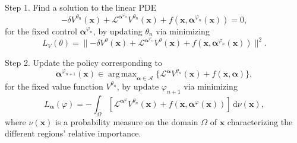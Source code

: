 \documentclass[12pt]{article}
\newcommand{\mc}[1]{\mathcal{#1}}
\newcommand{\ud}{\,\mathrm{d}}
\DeclareMathOperator*{\argmax}{arg\,max}
\begin{document}
\vspace{0.25cm}

\noindent Step 1. Find a solution to the linear PDE
\begin{equation*}
   - \delta V^{\theta_n}(\bm x) + \mc{L}^{\bm \alpha^{\varphi_{n}}}V^{\theta_n}(\bm x) + f(\bm x, \bm\alpha^{\varphi_{n}}(\bm x)) = 0,
\end{equation*}
for the fixed control $\bm \alpha^{\varphi_n}$, by updating $\theta_n$ via minimizing
\begin{equation*}\label{eq:DGM_HJB}
    L_V (\theta ) = \lVert  - \delta V^{\theta}(\bm x) + \mc{L}^{\bm \alpha^{\varphi_n}}V^{\theta}(\bm x) + f(\bm x, \bm\alpha^{\varphi_n}(\bm x))  \rVert^2.
\end{equation*}

\noindent Step 2. Update the policy corresponding to 
\begin{equation*}
\bm \alpha^{\varphi_{n+1}}(\bm x) \in \argmax_{\bm \alpha \in \mc{A}} \{ \mc{L}^{\bm \alpha} V^{\theta_n}(\bm x) + f(\bm x, \bm \alpha)\},
\end{equation*}
for the fixed value function $V^{\theta_n}$, by update $\varphi_{n+1}$ via minimizing
\begin{equation*}\label{eq:DGM_ctrl}
    L_{\bm \alpha}(\varphi) = - \int_\Omega \left[ \mc{L}^{\bm \alpha^\varphi} V^{\theta_n}(\bm x) + f(\bm x, \bm \alpha^\varphi(\bm x)) \right] \ud \nu(\bm x),
\end{equation*}
where $\nu(\bm x)$ is a probability measure on the domain $\Omega$ of $\bm x$ characterizing the different regions' relative importance. 

\vspace{0.25cm}


\end{document}
